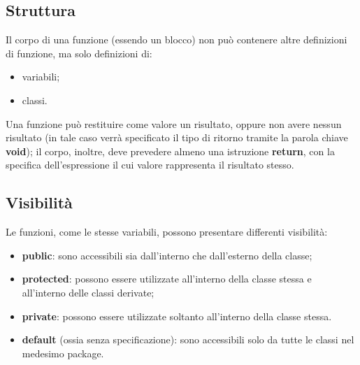 \documentclass[a4paper]{extarticle}
\begin{document}
\vspace{1em}
\subsection{Struttura}
Il corpo di una funzione (essendo un blocco) non può contenere altre definizioni di funzione, ma solo definizioni di:
\begin{itemize}
  \item variabili;
  \item classi.
\end{itemize}
Una funzione può restituire come valore un risultato, oppure non avere nessun risultato (in tale caso verrà specificato il tipo di ritorno tramite la parola chiave \textbf{void}); il corpo, inoltre, deve prevedere almeno una istruzione \textbf{return}, con la specifica dell’espressione il cui valore rappresenta il risultato stesso.

\vspace{1em}
\subsection{Visibilità}
Le funzioni, come le stesse variabili, possono presentare differenti visibilità:
\begin{itemize}
  \item \textbf{public}: sono accessibili sia dall’interno che dall’esterno della classe;
  \item \textbf{protected}: possono essere utilizzate all’interno della classe stessa e all’interno delle classi derivate;
  \item \textbf{private}: possono essere utilizzate soltanto all’interno della classe stessa.
  \item \textbf{default} (ossia senza specificazione): sono accessibili solo da tutte le classi nel medesimo package.
\end{itemize}
\end{document}
